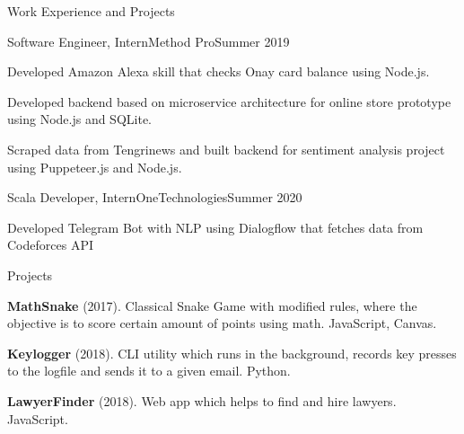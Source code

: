 \documentclass[]{mcdowellcv}
\let\tempone\itemize
\let\temptwo\enditemize
\renewenvironment{itemize}{\tempone\addtolength{\itemsep}{0.25\baselineskip}}{\temptwo}
\begin{document}
	\makeheader
	
	\begin{cvsection}{Work Experience and Projects}
		\begin{cvsubsection}{Software Engineer, Intern}{Method Pro}{Summer 2019}
			\begin{itemize}
				\item Developed Amazon Alexa skill that checks Onay card balance using Node.js.
				\item Developed backend based on microservice architecture for online store prototype using Node.js and SQLite.
				\item Scraped data from Tengrinews and built backend for sentiment analysis project using Puppeteer.js and Node.js.
			\end{itemize}
		\end{cvsubsection}

    \begin{cvsubsection}{Scala Developer, Intern}{OneTechnologies}{Summer 2020}
			\begin{itemize}
        \item Developed Telegram Bot with NLP using Dialogflow that fetches data from Codeforces API
			\end{itemize}
		\end{cvsubsection}

    \begin{cvsubsection}{Projects}{}{}
			\begin{itemize}
				\item \textbf{MathSnake} (2017). Classical Snake Game with modified rules, where the objective is to score certain amount of points using math. JavaScript, Canvas. 
				\item \textbf{Keylogger} (2018). CLI utility which runs in the background, records key presses to the logfile and sends it to a given email. Python.
        \item \textbf{LawyerFinder} (2018). Web app which helps to find and hire lawyers. JavaScript.
			\end{itemize}
		\end{cvsubsection}
	\end{cvsection}
\end{document}
